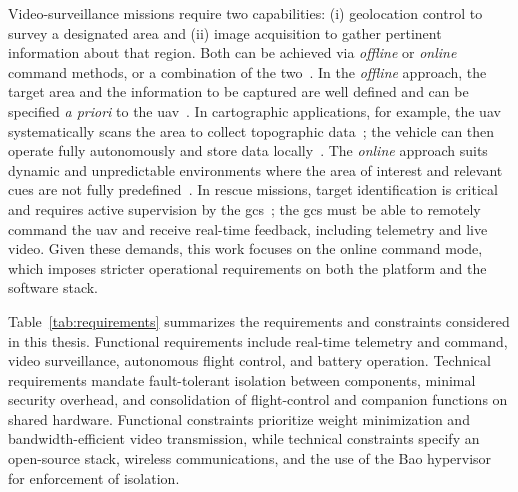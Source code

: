 Video-surveillance missions require two capabilities: (i) geolocation control to
survey a designated area and (ii) image acquisition to gather pertinent
information about that region. Both can be achieved via \emph{offline} or
\emph{online} command methods, or a combination of the two~\cite{gugan2023path}.
%
In the \emph{offline} approach, the target area and the information to be
captured are well defined and can be specified \emph{a priori} to the
\gls{uav}~\cite{gugan2023path}. In cartographic applications, for example, the
\gls{uav} systematically scans the area to collect topographic
data~\cite{caroti_uav-borne_2017}; the vehicle can then operate fully
autonomously and store data locally~\cite{qgc-survey}.
%
The \emph{online} approach suits dynamic and unpredictable environments where
the area of interest and relevant cues are not fully
predefined~\cite{gugan2023path}. In rescue missions, target identification is
critical and requires active supervision by the
\gls{gcs}~\cite{mohsan2022towards}; the \gls{gcs} must be able to remotely
command the \gls{uav} and receive real-time feedback, including telemetry and
live video.
%
Given these demands, this work focuses on the online command mode, which imposes stricter operational requirements on both the platform and the software stack.

Table~\ref{tab:requirements} summarizes the requirements and constraints
considered in this thesis. Functional requirements include real-time telemetry
and command, video surveillance, autonomous flight control, and battery
operation. Technical requirements mandate fault-tolerant isolation between
components, minimal security overhead, and consolidation of flight-control and
companion functions on shared hardware. Functional constraints prioritize weight
minimization and bandwidth-efficient video transmission, while technical
constraints specify an open-source stack, wireless communications, and the use
of the Bao hypervisor for enforcement of isolation.


